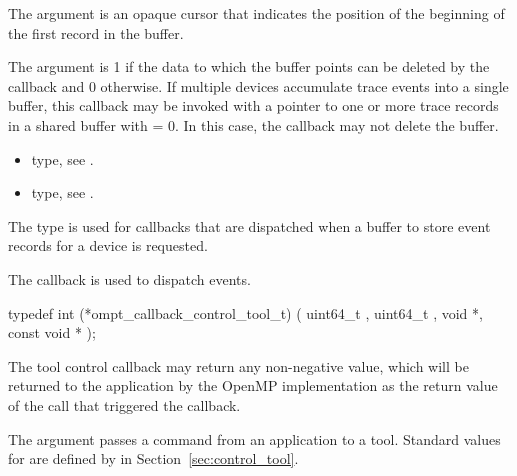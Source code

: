 The  argument is an opaque cursor that indicates the position 
of the beginning of the first record in the buffer.

The  argument is 1 if the data to which the buffer points
can be deleted by the callback and 0 otherwise. If multiple devices accumulate 
trace events into a single buffer, this callback may be invoked with a pointer 
to one or more trace records in a shared buffer with  = 0. 
In this case, the callback may not delete the buffer.

\crossreferences
\begin{itemize}
\item {} type, see .

\item {} type, see .
\end{itemize}



\label{sec:ompt_callback_control_tool_t}

\summary
The  type is used for callbacks that are
dispatched when a buffer to store event records for a device is requested.

The  callback is used to dispatch
 events.

\format

\begin{ccppspecific}
\begin{omptCallback}
typedef int (*ompt_callback_control_tool_t) (
  uint64_t ,
  uint64_t ,
  void *,
  const void *
);
\end{omptCallback}
\end{ccppspecific}


\descr

The tool control callback may return any non-negative value, which will be returned to the
application by the OpenMP implementation as the return value of the
 call that triggered the callback.

\argdesc

The argument  passes a command from an application
to a tool.  Standard values for  are defined by
 in Section~\ref{sec:control_tool}.

